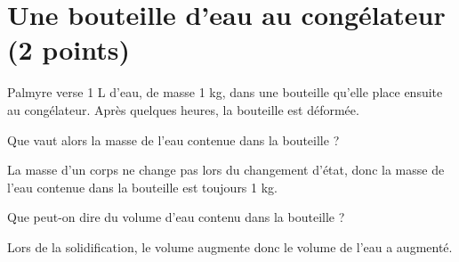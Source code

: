 \section{Une bouteille d'eau au congélateur (2 points)}\label{ex:congel}

Palmyre verse 1 L d'eau, de masse 1 kg, dans une bouteille qu'elle place ensuite au congélateur. Après quelques heures, la bouteille est déformée.

\begin{questions}
	\question[1] Que vaut alors la masse de l'eau contenue dans la bouteille ?
	\begin{solution}
		La masse d'un corps ne change pas lors du changement d'état, donc la masse de l'eau contenue dans la bouteille est toujours 1 kg.
	\end{solution}
	
	\question[1] Que peut-on dire du volume d'eau contenu dans la bouteille ?
	\begin{solution}
		Lors de la solidification, le volume augmente donc le volume de l'eau a augmenté.
	\end{solution}
\end{questions}